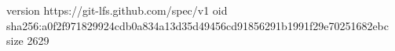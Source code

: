 version https://git-lfs.github.com/spec/v1
oid sha256:a0f2f971829924cdb0a834a13d35d49456cd91856291b1991f29e70251682ebc
size 2629
